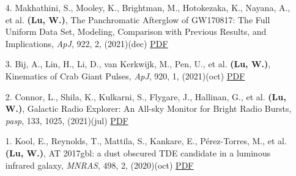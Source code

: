 \begin{itemize}[leftmargin=0.65cm]
\vspace{-0.1cm}
\item[4.]{Makhathini, S., Mooley, K., Brightman, M., Hotokezaka, K., Nayana, A., et al. {\bf (Lu, W.)}, {The Panchromatic Afterglow of GW170817: The Full Uniform Data Set, Modeling, Comparison with Previous Results, and Implications}, {\it ApJ}, 922, 2, (2021)(dec) \href{https://ui.adsabs.harvard.edu/abs/2021ApJ...922..154M}{\underline{PDF}}}

\vspace{-0.1cm}
\item[3.]{Bij, A., Lin, H., Li, D., van Kerkwijk, M., Pen, U., et al. {\bf (Lu, W.)}, {Kinematics of Crab Giant Pulses}, {\it ApJ}, 920, 1, (2021)(oct) \href{https://ui.adsabs.harvard.edu/abs/2021ApJ...920...38B}{\underline{PDF}}}

\vspace{-0.1cm}
\item[2.]{Connor, L., Shila, K., Kulkarni, S., Flygare, J., Hallinan, G., et al. {\bf (Lu, W.)}, {Galactic Radio Explorer: An All-sky Monitor for Bright Radio Bursts}, {\it pasp}, 133, 1025, (2021)(jul) \href{https://ui.adsabs.harvard.edu/abs/2021PASP..133g5001C}{\underline{PDF}}}

\vspace{-0.1cm}
\item[1.]{Kool, E., Reynolds, T., Mattila, S., Kankare, E., P{\'e}rez-Torres, M., et al. {\bf (Lu, W.)}, {AT 2017gbl: a dust obscured TDE candidate in a luminous infrared galaxy}, {\it MNRAS}, 498, 2, (2020)(oct) \href{https://ui.adsabs.harvard.edu/abs/2020MNRAS.498.2167K}{\underline{PDF}}}
\end{itemize}